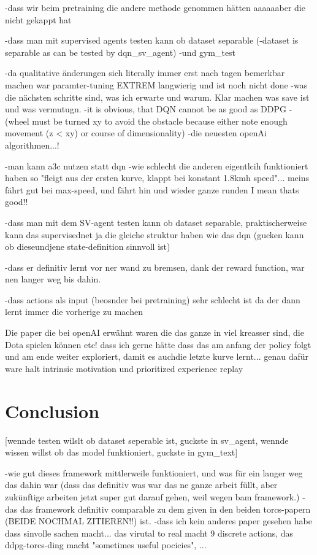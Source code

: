 -dass wir beim pretraining die andere methode genommen hätten aaaaaaber die nicht gekappt hat

-dass man mit supervised agents testen kann ob dataset separable (-dataset is separable as can be tested by dqn\_sv\_agent)
-und gym_test

-da qualitative änderungen sich literally immer erst nach tagen bemerkbar machen war paramter-tuning EXTREM langwierig und ist noch nicht done
-was die nächsten schritte sind, was ich erwarte und warum. Klar machen was save ist und was vermutugn.
-it is obvious, that DQN cannot be as good as DDPG - (wheel must be turned xy to avoid the obstacle because either note enough movement (z < xy) or course of dimensionality)
-die neuesten openAi algorithmen...!

-man kann a3c nutzen statt dqn
-wie schlecht die anderen eigentlcih funktioniert haben so "fleigt aus der ersten kurve, klappt bei konstant 1.8kmh speed"... meins fährt gut bei max-speed, und fährt hin und wieder ganze runden I mean thats good!!

-dass man mit dem SV-agent testen kann ob dataset separable, praktischerweise kann das supervisednet ja die gleiche struktur haben wie das dqn (gucken kann ob dieseundjene state-definition sinnvoll ist)

-dass er definitiv lernt vor ner wand zu bremsen, dank der reward function, war nen langer weg bis dahin.

-dass actions als input (beosnder bei pretraining) sehr schlecht ist da der dann lernt immer die vorherige zu machen

Die paper die bei openAI erwähnt waren die das ganze in viel kreasser sind, die Dota spielen können etc!
dass ich gerne hätte dass das am anfang der policy folgt und am ende weiter exploriert, damit es auchdie letzte kurve lernt... genau dafür ware halt intrinsic motivation und prioritized experience replay

\chapter{Conclusion}


[wennde testen wilslt ob dataset seperable ist, guckste in sv\_agent, wennde wissen willst ob das model funktioniert, guckste in gym\_text]


-wie gut dieses framework mittlerweile funktioniert, und was für ein langer weg das dahin war (dass das definitiv was war das ne ganze arbeit füllt, aber zukünftige arbeiten jetzt super gut darauf gehen, weil wegen bam framework.)
-das das framework definitiv comparable zu dem given in den beiden torcs-papern (BEIDE NOCHMAL ZITIEREN!!) ist.
-dass ich kein anderes paper gesehen habe dass sinvolle sachen macht... das virutal to real macht 9 discrete actions, das ddpg-torcs-ding macht "sometimes useful pocicies", ...

